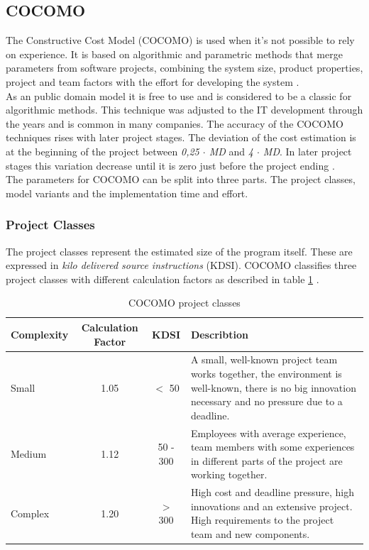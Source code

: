 \subsection{COCOMO} \label{COCOMOMethod}

The Constructive Cost Model (COCOMO) is used when it's not possible to rely on experience. It is based on algorithmic and parametric methods that merge parameters from software projects, combining the system size, product properties, project and team factors with the effort for developing the system \cite{jenny}.\\
As an public domain model it is free to use and is considered to be a classic for algorithmic methods. This technique was adjusted to the IT development through the years and is common in many companies.
The accuracy of the COCOMO techniques rises with later project stages. The deviation of the cost estimation is at the beginning of the project between \textit{0,25 $\cdot$ MD} and \textit{4 $\cdot$ MD}. In later project stages this variation decrease until it is zero just before the project ending \cite{sommerville}.\\
The parameters for COCOMO can be split into three parts. The project classes, model variants and the implementation time and effort.

\subsubsection{Project Classes}

The project classes represent the estimated size of the program itself. These are expressed in \textit{kilo delivered source instructions} (KDSI). COCOMO classifies three project classes with different calculation factors as described in table \ref{tab:projectclasses} \cite{sommerville}.

\begin{table}[h]
	\centering 
	\setlength{\tabcolsep}{4pt}
	\begin{tabular}{|l|c|c|p{6cm}|}\hline
		Complexity	& Calculation Factor& KDSI 	& Describtion\\ \hline
		Small   	& 1.05        		& $<$ 50  			& A small, well-known project team works together, the environment is well-known, there is no big innovation necessary and no pressure due to a deadline.\\ \hline
		Medium 		& 1.12        		& 50 - 300 			& Employees with average experience, team members with some experiences in different parts of the project are working together.  \\ \hline
		Complex 	& 1.20 				& $>$ 300 			& High cost and deadline pressure, high innovations and an extensive project. High requirements to the project team and new components.  \\ \hline
	\end{tabular} 
	\caption{COCOMO project classes} 
	\label{tab:projectclasses} 
\end{table}

